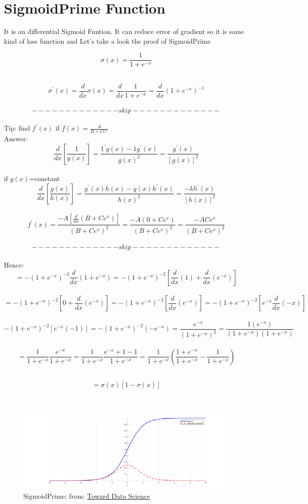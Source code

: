 \documentclass[12pt,a4paper]{article}
\begin{document}
\section{SigmoidPrime Function}
It is an differential Sigmoid Funtion. It can reduce  error of gradient so it is some kind of loss function and Let's take a look the proof of SigmoidPrime\\
\begin{Large}$$\sigma(x)=\frac{1}{1+e^{-x}}$$ \end{Large}\\[6pt]
$$\sigma^{'}(x)=\frac{d}{dx}\sigma(x)=\frac{d}{dx}\frac{1}{1+e^{-x}}=\frac{d}{dx}(1+e^{-x})^{-1}$$\\[6pt]
$$-------------skip-------------$$\\[6pt]
Tip: find $f^{'}(x)$ if $f(x)=\frac{A}{B+Ce^{x}}$\\
Answer:\\
$$\frac{d}{dx}[\frac{1}{g(x)}]=\frac{1^{'}g(x)-1g^{'}(x)}{g(x)^2}=\frac{g^{'}(x)}{[g(x)]^2}$$\\
if $g(x)$=constant\\
$$\frac{d}{dx}[\frac{g(x)}{h(x)}]=\frac{g^{'}(x)h(x)-g(x)h^{'}(x)}{h(x)^2}= \frac{-kh^{'}(x)}{[h(x)]^2}$$\\
$$f^{'}(x)=\frac{-A[\frac{d}{dx}(B+Ce^x)]}{(B+Ce^x)^2}=\frac{-A(0+Ce^x)}{(B+Ce^x)^2}=\frac{-ACe^x}{(B+Ce^x)^2}$$\\[6pt]
$$-------------skip-------------$$\\[6pt]
Hence:\\
$$=-(1+e^{-x})^{-2}\frac{d}{dx}(1+e^{-x})=-(1+e^{-x})^{-2}[\frac{d}{dx}(1)+\frac{d}{dx}(e^{-x})]$$\\
$$=-(1+e^{-x})^{-2}[0+\frac{d}{dx}(e^{-x})]=-(1+e^{-x})^{-2}[\frac{d}{dx}(e^{-x})]=-(1+e^{-x})^{-2}[e^{-x}\frac{d}{dx}(-x)]$$\\
$$-(1+e^{-x})^{-2}[e^{-x}(-1)]=-(1+e^{-x})^{-2}(-e^{-x})=\frac{e^{-x}}{(1+e^{-x})^2}=\frac{1(e^{-x})}{(1+e^{-x})(1+e^{-x})}$$\\
$$=\frac{1}{1+e^{-x}}\frac{e^{-x}}{1+e^{-x}}=\frac{1}{1+e^{-x}}\frac{e^{-x}+1-1}{1+e^{-x}}=\frac{1}{1+e^{-x}}(\frac{1+e^{-x}}{1+e^{-x}}-\frac{1}{1+e^{-x}})$$\\[6pt]
\begin{Large}$$=\sigma(x)[1-\sigma(x)]$$\end{Large}\\
\begin{figure}[hbt!]
\begin{center}
\includegraphics[scale=0.80]{sigmoidprime}
\caption{SigmoidPrime; from: \href{https://towardsdatascience.com/derivative-of-the-sigmoid-function-536880cf918e}{Toward Data Science}}
\end{center}
\end{figure}
\end{document}
